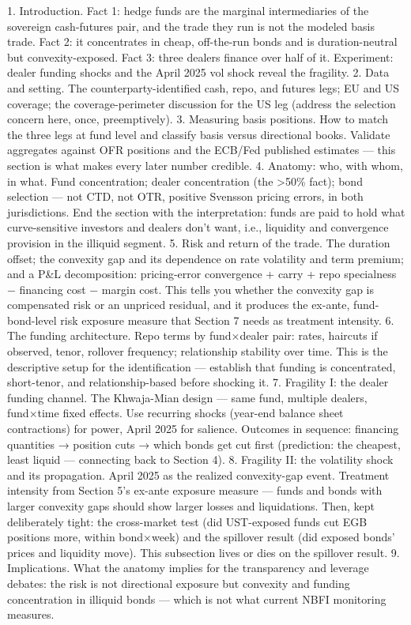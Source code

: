 1. Introduction. Fact 1: hedge funds are the marginal intermediaries of the sovereign cash-futures pair, and the trade they run is not the modeled basis trade. Fact 2: it concentrates in cheap, off-the-run bonds and is duration-neutral but convexity-exposed. Fact 3: three dealers finance over half of it. Experiment: dealer funding shocks and the April 2025 vol shock reveal the fragility.
2. Data and setting. The counterparty-identified cash, repo, and futures legs; EU and US coverage; the coverage-perimeter discussion for the US leg (address the selection concern here, once, preemptively).
3. Measuring basis positions. How to match the three legs at fund level and classify basis versus directional books. Validate aggregates against OFR positions and the ECB/Fed published estimates — this section is what makes every later number credible.
4. Anatomy: who, with whom, in what. Fund concentration; dealer concentration (the >50\% fact); bond selection — not CTD, not OTR, positive Svensson pricing errors, in both jurisdictions. End the section with the interpretation: funds are paid to hold what curve-sensitive investors and dealers don't want, i.e., liquidity and convergence provision in the illiquid segment.
5. Risk and return of the trade. The duration offset; the convexity gap and its dependence on rate volatility and term premium; and a P\&L decomposition: pricing-error convergence + carry + repo specialness − financing cost − margin cost. This tells you whether the convexity gap is compensated risk or an unpriced residual, and it produces the ex-ante, fund-bond-level risk exposure measure that Section 7 needs as treatment intensity.
6. The funding architecture. Repo terms by fund×dealer pair: rates, haircuts if observed, tenor, rollover frequency; relationship stability over time. This is the descriptive setup for the identification — establish that funding is concentrated, short-tenor, and relationship-based before shocking it.
7. Fragility I: the dealer funding channel. The Khwaja-Mian design — same fund, multiple dealers, fund×time fixed effects. Use recurring shocks (year-end balance sheet contractions) for power, April 2025 for salience. Outcomes in sequence: financing quantities → position cuts → which bonds get cut first (prediction: the cheapest, least liquid — connecting back to Section 4).
8. Fragility II: the volatility shock and its propagation. April 2025 as the realized convexity-gap event. Treatment intensity from Section 5's ex-ante exposure measure — funds and bonds with larger convexity gaps should show larger losses and liquidations. Then, kept deliberately tight: the cross-market test (did UST-exposed funds cut EGB positions more, within bond×week) and the spillover result (did exposed bonds' prices and liquidity move). This subsection lives or dies on the spillover result.
9. Implications. What the anatomy implies for the transparency and leverage debates: the risk is not directional exposure but convexity and funding concentration in illiquid bonds — which is not what current NBFI monitoring measures.

